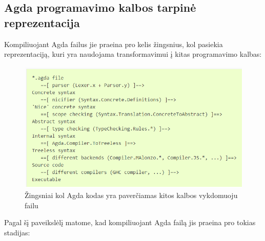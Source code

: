 \documentclass{VUMIFPSkursinis}
\begin{document}
\subsection{Agda programavimo kalbos tarpinė reprezentacija}
Kompiliuojant Agda failus jie praeina pro kelis žingsnius, kol pasiekia reprezentaciją, kuri yra naudojama transformavimui į kitas programavimo kalbas:
\begin{figure}[H]
	\centering
	\includegraphics{agdaFileCompilation.png}
	\caption{Žingsniai kol Agda kodas yra paverčiamas kitos kalbos vykdomuoju failu \cite{AgdaWeb}}
	\centering
	\end{figure}
Pagal šį paveikslėlį matome, kad kompiliuojant Agda failą jis praeina pro tokias stadijas: 
\end{document}
